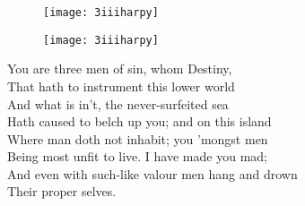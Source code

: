 \begin{letter}
	\begin{figure}[tb]
		\centering
		\texttt{[image: 3iiiharpy]}
	\end{figure}
\end{letter}
\begin{a4}
	\begin{figure}[tb]
		\centering
		\texttt{[image: 3iiiharpy]}
	\end{figure}
\end{a4}


\begin{verse_speech}[Ariel] 
You are three men of sin, whom Destiny,\\
That hath to instrument this lower world\\
And what is in't, the never-surfeited sea\\
Hath caused to belch up you; and on this island\\
Where man doth not inhabit; you 'mongst men\\
Being most unfit to live. I have made you mad;\\
And even with such-like valour men hang and drown\\
Their proper selves.



\end{verse_speech}

